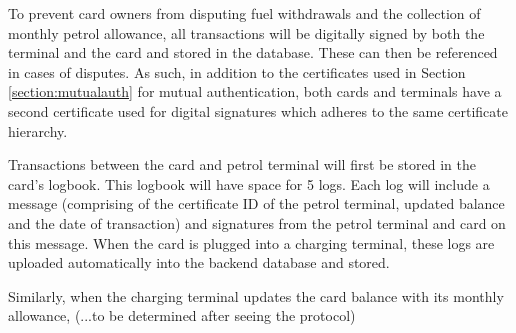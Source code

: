 To prevent card owners from disputing fuel withdrawals and the collection of monthly petrol allowance, all transactions will be digitally signed by both the terminal and the card and stored in the database. These can then be referenced in cases of disputes. As such, in addition to the certificates used in Section \ref{section:mutualauth} for mutual authentication, both cards and terminals have a second certificate used for digital signatures which adheres to the same certificate hierarchy.

Transactions between the card and petrol terminal will first be stored in the card's logbook. This logbook will have space for 5 logs. Each log will include a message (comprising of the certificate ID of the petrol terminal, updated balance and the date of transaction) and signatures from the petrol terminal and card on this message. When the card is plugged into a charging terminal, these logs are uploaded automatically into the backend database and stored.

Similarly, when the charging terminal updates the card balance with its monthly allowance, (...to be determined after seeing the protocol)